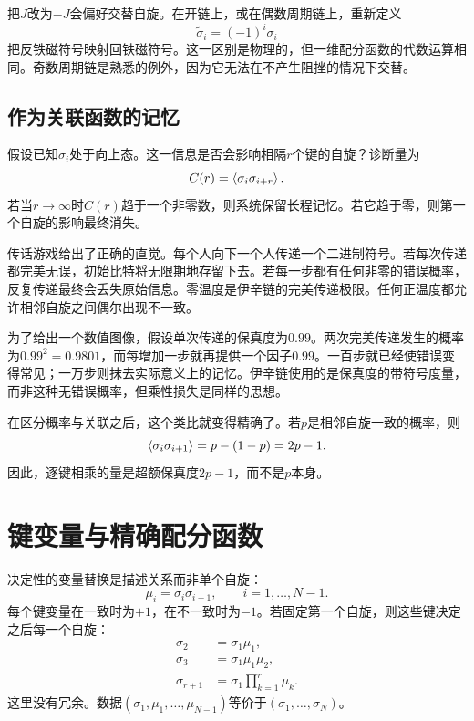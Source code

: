 把\(J\)改为\(-J\)会偏好交替自旋。在开链上，或在偶数周期链上，重新定义
\begin{equation}
\widetilde{\sigma}_i=(-1)^i\sigma_i
\end{equation}
把反铁磁符号映射回铁磁符号。这一区别是物理的，但一维配分函数的代数运算相同。奇数周期链是熟悉的例外，因为它无法在不产生阻挫的情况下交替。

\begin{classroomqa}
\end{classroomqa}

\subsection{作为关联函数的记忆}

假设已知\(\sigma_i\)处于向上态。这一信息是否会影响相隔\(r\)个键的自旋？诊断量为
\begin{equation}
C(r)=\left\langle\sigma_i\sigma_{i+r}\right\rangle.
\end{equation}
若当\(r\to\infty\)时\(C(r)\)趋于一个非零数，则系统保留长程记忆。若它趋于零，则第一个自旋的影响最终消失。

传话游戏给出了正确的直觉。每个人向下一个人传递一个二进制符号。若每次传递都完美无误，初始比特将无限期地存留下去。若每一步都有任何非零的错误概率，反复传递最终会丢失原始信息。零温度是伊辛链的完美传递极限。任何正温度都允许相邻自旋之间偶尔出现不一致。

为了给出一个数值图像，假设单次传递的保真度为\(0.99\)。两次完美传递发生的概率为\(0.99^2=0.9801\)，而每增加一步就再提供一个因子\(0.99\)。一百步就已经使错误变得常见；一万步则抹去实际意义上的记忆。伊辛链使用的是保真度的带符号度量，而非这种无错误概率，但乘性损失是同样的思想。

在区分概率与关联之后，这个类比就变得精确了。若\(p\)是相邻自旋一致的概率，则
\begin{equation}
\left\langle\sigma_i\sigma_{i+1}\right\rangle
=p-(1-p)=2p-1.
\end{equation}
因此，逐键相乘的量是超额保真度\(2p-1\)，而不是\(p\)本身。

\section{键变量与精确配分函数}

决定性的变量替换是描述关系而非单个自旋：
\begin{equation}
\mu_i=\sigma_i\sigma_{i+1},
\qquad i=1,\ldots,N-1.
\label{eq:bond-variable}
\end{equation}
每个键变量在一致时为\(+1\)，在不一致时为\(-1\)。若固定第一个自旋，则这些键决定之后每一个自旋：
\begin{align}
\sigma_2&=\sigma_1\mu_1,\\
\sigma_3&=\sigma_1\mu_1\mu_2,\\
\sigma_{r+1}&=\sigma_1\prod_{k=1}^{r}\mu_k.
\end{align}
这里没有冗余。数据\((\sigma_1,\mu_1,\ldots,\mu_{N-1})\)等价于\((\sigma_1,\ldots,\sigma_N)\)。

